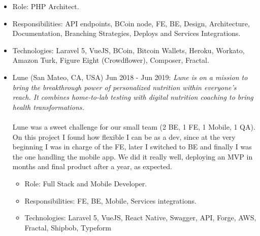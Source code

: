 \documentclass[11pt,a4paper,sans]{moderncv}        %
\begin{document}
{\begin{itemize}
    \begin{itemize}
      \item Role: PHP Architect.
      \item Responsibilities: API endpoints, BCoin node, FE, BE, Design, Architecture, Documentation, Branching Strategies, Deploys and Services Integrations.
      \item Technologies: Laravel 5, VueJS, BCoin, Bitcoin Wallets, Heroku, Workato, Amazon Turk, Figure Eight (Crowdflower), Composer, Fractal.
    \end{itemize}
  \end{itemize}
  \bigskip
  \begin{itemize}
    \item Lune (San Mateo, CA, USA) Jun 2018 - Jun 2019:
    \textit{Lune is on a mission to bring the breakthrough power of personalized nutrition within everyone's reach. It combines home-to-lab testing with digital nutrition coaching to bring health transformations.}\\
    \\Lune was a sweet challenge for our small team (2 BE, 1 FE, 1 Mobile, 1 QA). On this project I found how flexible I can be as a dev, since at the very beginning I was in charge of the FE, later I switched to BE and finally I was the one handling the mobile app. We did it really well, deploying an MVP in months and final product after a year, as expected.\\
    \begin{itemize}
      \item Role: Full Stack and Mobile Developer.
      \item Responsibilities: FE, BE, Mobile, Services integrations.
      \item Technologies: Laravel 5, VueJS, React Native, Swagger, API, Forge, AWS, Fractal, Shipbob, Typeform
    \end{itemize}
  \end{itemize}
}
\medskip
{}
\end{document}

